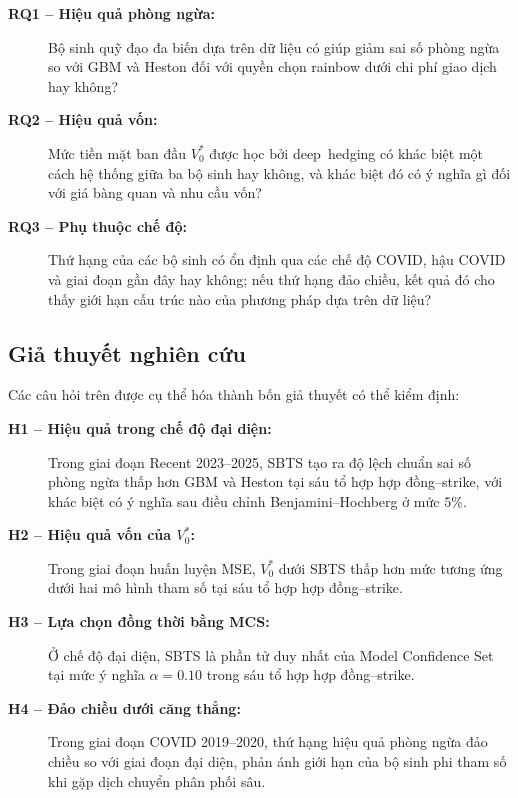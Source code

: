 \begin{description}
    \item[\textbf{RQ1 -- Hiệu quả phòng ngừa:}] Bộ sinh quỹ đạo đa biến dựa
    trên dữ liệu có giúp giảm sai số phòng ngừa so với \textsc{GBM} và Heston
    đối với quyền chọn rainbow dưới chi phí giao dịch hay không?

    \item[\textbf{RQ2 -- Hiệu quả vốn:}] Mức tiền mặt ban đầu $V_0^{*}$ được
    học bởi \mbox{deep hedging} có khác biệt một cách hệ thống giữa ba bộ sinh hay
    không, và khác biệt đó có ý nghĩa gì đối với giá bàng quan và nhu cầu vốn?

    \item[\textbf{RQ3 -- Phụ thuộc chế độ:}] Thứ hạng của các bộ sinh có ổn
    định qua các chế độ COVID, hậu COVID và giai đoạn gần đây hay không; nếu
    thứ hạng đảo chiều, kết quả đó cho thấy giới hạn cấu trúc nào của phương
    pháp dựa trên dữ liệu?
\end{description}

\subsection{Giả thuyết nghiên cứu}

Các câu hỏi trên được cụ thể hóa thành bốn giả thuyết có thể kiểm định:

\begin{description}
    \item[\textbf{H1 -- Hiệu quả trong chế độ đại diện:}] Trong giai đoạn
    Recent 2023--2025, \textsc{SBTS} tạo ra độ lệch chuẩn sai số phòng ngừa
    thấp hơn \textsc{GBM} và Heston tại sáu tổ hợp hợp đồng--strike, với khác
    biệt có ý nghĩa sau điều chỉnh Benjamini--Hochberg ở mức $5\%$.

    \item[\textbf{H2 -- Hiệu quả vốn của $V_0^{*}$:}] Trong giai đoạn huấn
    luyện MSE, $V_0^{*}$ dưới \textsc{SBTS} thấp hơn mức tương ứng dưới hai mô
    hình tham số tại sáu tổ hợp hợp đồng--strike.

    \item[\textbf{H3 -- Lựa chọn đồng thời bằng MCS:}] Ở chế độ đại diện,
    \textsc{SBTS} là phần tử duy nhất của Model Confidence Set tại mức ý nghĩa
    $\alpha=0.10$ trong sáu tổ hợp hợp đồng--strike.

    \item[\textbf{H4 -- Đảo chiều dưới căng thẳng:}] Trong giai đoạn COVID
    2019--2020, thứ hạng hiệu quả phòng ngừa đảo chiều so với giai đoạn đại
    diện, phản ánh giới hạn của bộ sinh phi tham số khi gặp dịch chuyển phân
    phối sâu.
\end{description}

